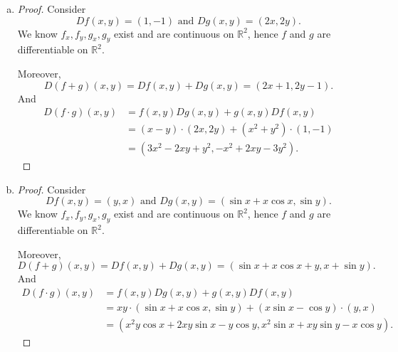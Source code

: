 \begin{Exercise}
\begin{enumerate}[a)]
\item
\begin{proof}
Consider
$$
D f(x,y) = (1,-1)\text{ and } D g(x,y) = (2x,2y).
$$
We know $f_x, f_y, g_x, g_y$ exist and are continuous on $\mathbb{R}^2$, hence $f$ and $g$ are differentiable on $\mathbb{R}^2$.

Moreover,
$$
D(f+g)(x,y) = D f(x,y) + D g(x,y) = (2x+1,2y-1).
$$
And
\begin{align*}
D(f\cdot g)(x,y) 
&= f(x,y)D g(x,y) + g(x,y)D f(x,y) \\
&= (x-y)\cdot(2x,2y) + (x^2+y^2)\cdot(1,-1) \\
&= (3x^2-2x y+y^2, -x^2+2x y-3y^2).
\end{align*}
\end{proof}

\item
\begin{proof}
Consider
$$
D f(x,y) = (y,x)\text{ and } D g(x,y) = (\sin x+x\cos x,\sin y).
$$
We know $f_x, f_y, g_x, g_y$ exist and are continuous on $\mathbb{R}^2$, hence $f$ and $g$ are differentiable on $\mathbb{R}^2$.

Moreover,
$$
D(f+g)(x,y) = D f(x,y) + D g(x,y) = (\sin x+x\cos x+y,x+\sin y).
$$
And
\begin{align*}
D(f\cdot g)(x,y) 
&= f(x,y)D g(x,y) + g(x,y)D f(x,y) \\
&= x y\cdot(\sin x+x\cos x, \sin y)+(x\sin x-\cos y)\cdot(y,x) \\
&= (x^2 y \cos x+2x y\sin x-y\cos y, x^2\sin x+x y\sin y-x\cos y).
\end{align*}
\end{proof}
\end{enumerate}
\end{Exercise}